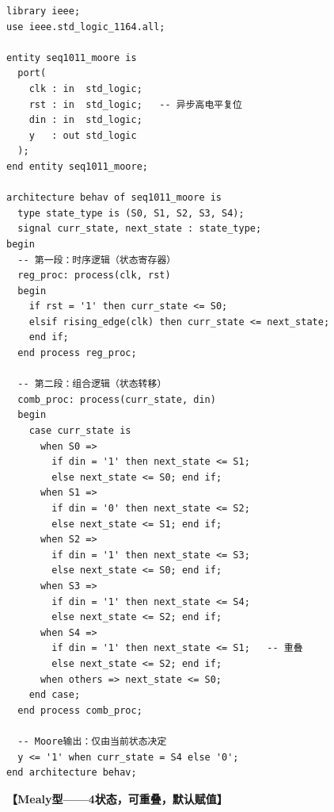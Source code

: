 \begin{lstlisting}[caption={Moore型1011序列检测器}]
library ieee;
use ieee.std_logic_1164.all;

entity seq1011_moore is
  port(
    clk : in  std_logic;
    rst : in  std_logic;   -- 异步高电平复位
    din : in  std_logic;
    y   : out std_logic
  );
end entity seq1011_moore;

architecture behav of seq1011_moore is
  type state_type is (S0, S1, S2, S3, S4);
  signal curr_state, next_state : state_type;
begin
  -- 第一段：时序逻辑（状态寄存器）
  reg_proc: process(clk, rst)
  begin
    if rst = '1' then curr_state <= S0;
    elsif rising_edge(clk) then curr_state <= next_state;
    end if;
  end process reg_proc;

  -- 第二段：组合逻辑（状态转移）
  comb_proc: process(curr_state, din)
  begin
    case curr_state is
      when S0 =>
        if din = '1' then next_state <= S1;
        else next_state <= S0; end if;
      when S1 =>
        if din = '0' then next_state <= S2;
        else next_state <= S1; end if;
      when S2 =>
        if din = '1' then next_state <= S3;
        else next_state <= S0; end if;
      when S3 =>
        if din = '1' then next_state <= S4;
        else next_state <= S2; end if;
      when S4 =>
        if din = '1' then next_state <= S1;   -- 重叠
        else next_state <= S2; end if;
      when others => next_state <= S0;
    end case;
  end process comb_proc;

  -- Moore输出：仅由当前状态决定
  y <= '1' when curr_state = S4 else '0';
end architecture behav;
\end{lstlisting}

\textbf{【Mealy型——4状态，可重叠，默认赋值】}

